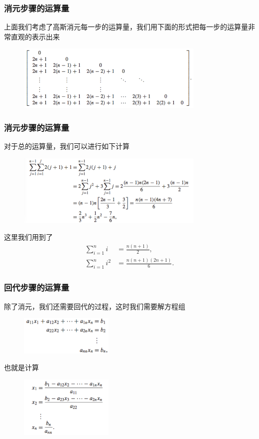 \documentclass[10pt]{beamer}
\begin{document}
\begin{frame}
\frametitle{消元步骤的运算量}
上面我们考虑了高斯消元每一步的运算量，我们用下面的形式把每一步的运算量非常直观的表示出来
\begin{figure}
\includegraphics[width=9cm]{figs/2_1_2_Gaussian_Elimi_Operation_Counts} 
\end{figure}
\end{frame}


\begin{frame}
\frametitle{消元步骤的运算量}
对于总的运算量，我们可以进行如下计算
\begin{figure}
\includegraphics[width=9cm]{figs/2_1_2_Gaussian_Elimi_Operation_Counts-2} 
\end{figure}
这里我们用到了
\begin{align}
\sum_{i = 1}^n i     &= \frac{n(n+1)}{2}, \\
\sum_{i = 1}^n i^2 &= \frac{n(n+1)(2n+1)}{6}. 
\end{align}
\end{frame}


\begin{frame}
\frametitle{回代步骤的运算量}
除了消元，我们还需要回代的过程，这时我们需要解方程组
\begin{figure}
\includegraphics[width=4.5cm]{figs/2_1_2_Gaussian_Elimi_Operation_Counts-3} 
\end{figure}
也就是计算
\begin{figure}
\includegraphics[width=4.5cm]{figs/2_1_2_Gaussian_Elimi_Operation_Counts-4} 
\end{figure}
\end{frame}
\end{document}

